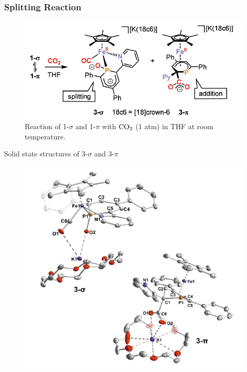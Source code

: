 \documentclass[10pt,aspectratio=43]{beamer}
\numberwithin{equation}{section}
\begin{document}
\begin{frame}
\frametitle{Splitting Reaction}
\begin{figure}
	\includegraphics[width=0.7\linewidth]{reax2.jpg}
	\caption{Reaction of 1-$ \sigma $ and 1-$ \pi $ with $ \ce{CO_2} $ (1 atm) in THF at room temperature.}
\end{figure}

\end{frame}

\begin{frame}
Solid state structures of 3-$ \sigma $ and 3-$ \pi $
\begin{figure}
	\includegraphics[width=0.7\linewidth]{3.jpg}
\end{figure}

\end{frame}
\end{document}
